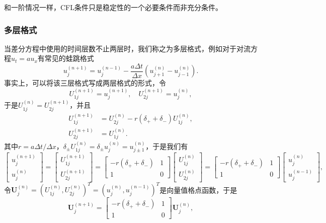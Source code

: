 \documentclass[a4paper,10pt]{ctexart}
\begin{document}
和一阶情况一样，CFL条件只是稳定性的一个必要条件而非充分条件。

\subsubsection{多层格式}
当差分方程中使用的时间层数不止两层时，我们称之为多层格式，例如对于对流方程$ u_t = au_x $有常见的蛙跳格式
\[
    u^{(n+1)}_j = u^{(n-1)}_j - \frac{a\Delta t}{\Delta x}(u^{(n)}_{j+1}-u^{(n)}_{j-1}).
\]
事实上，可以将该三层格式写成两层格式的形式，令
\[
    U^{(n+1)}_{1j} = u^{(n+1)}_j,\quad U^{(n+1)}_{2j} = u^{(n)}_j,
\]
于是$ U^{(n)}_{1j} = U^{(n+1)}_{2j} $，并且
\[
    \begin{aligned}
        U^{(n+1)}_{1j} &= U^{(n)}_{2j} - r (\delta_++\delta_-) U^{(n)}_{1j},\\
        U^{(n+1)}_{2j} &= U^{(n)}_{1j}.
    \end{aligned}
\]
其中$ r = a \Delta t / \Delta x $，$ \delta_{\pm}U^{(n)}_{1j} = \delta_{\pm}u^{(n)}_{j} = u^{(n)}_{j\pm 1} $，于是我们有
\[
    \begin{bmatrix} 
        u^{(n+1)}_j \\ u^{(n)}_j 
    \end{bmatrix} 
    =
    \begin{bmatrix} 
        U^{(n+1)}_{1j}\\
        U^{(n+1)}_{2j} 
    \end{bmatrix} = 
    \begin{bmatrix} 
        -r(\delta_++\delta_-) & 1\\
        1 & 0
    \end{bmatrix}
    \begin{bmatrix} 
        U^{(n)}_{1j}\\
        U^{(n)}_{2j}
    \end{bmatrix} =
    \begin{bmatrix} 
        -r(\delta_++\delta_-) & 1\\
        1 & 0
    \end{bmatrix}
    \begin{bmatrix} 
        u^{(n)}_j \\ u^{(n-1)}_j
    \end{bmatrix},
\]
令$ \bm{U}^{(n)}_j = (U^{(n)}_{1j}, U^{(n)}_{2j})^T = (u^{(n)}_{j}, u^{(n-1)}_j)^T $是向量值格点函数，于是
\begin{equation}
    \bm{U}^{(n+1)}_j = \begin{bmatrix} 
        -r(\delta_++\delta_-) & 1\\
        1 & 0
    \end{bmatrix} \bm{U}^{(n)}_j,
\end{equation}
\end{document}

